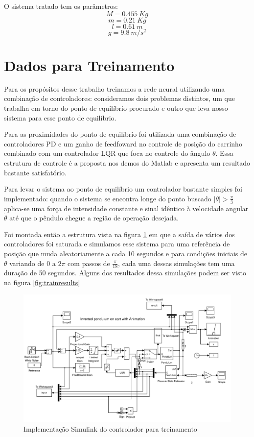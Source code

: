 \documentclass{article}
\begin{document}
O sistema tratado tem os parâmetros:
\begin{equation}
	M = 0.455\ Kg
\end{equation}
\begin{equation}
	m = 0.21\ Kg
\end{equation}
\begin{equation}
	l = 0.61\ m
\end{equation}
\begin{equation}
	g = 9.8\ m/s^2
\end{equation}
\section{Dados para Treinamento}
Para os propósitos desse trabalho treinamos a rede neural utilizando uma combinação de controladores: consideramos dois problemas distintos, um que trabalha em torno do ponto de equilíbrio procurado e outro que leva nosso sistema para esse ponto de equilíbrio. 

Para as proximidades do ponto de equilíbrio foi utilizada uma combinação de controladores PD e um ganho de feedfoward no controle de posição do carrinho combinado com um controlador LQR que foca no controle do ângulo $\theta$. Essa estrutura de controle é a proposta nos demos do Matlab e apresenta um resultado bastante satisfatório.

Para levar o sistema ao ponto de equilíbrio um controlador bastante simples foi implementado: quando o sistema se encontra longe do ponto buscado $|\theta| > \frac{\pi}{3}$ aplica-se uma força de intensidade constante e sinal idêntico à velocidade angular $\dot{\theta}$ até que o pêndulo chegue a região de operação desejada.

Foi montada então a estrutura vista na figura \ref{fig:train} em que a saída de vários dos controladores foi saturada e simulamos esse sistema para uma referência de posição que muda aleatoriamente a cada 10 segundos e para condições iniciais de $\theta$ variando de $0$ a $2\pi$ com passos de $\frac{\pi}{18}$, cada uma dessas simulações tem uma duração de 50 segundos. Alguns dos resultados dessa simulações podem ser visto na figura \ref{fig:trainresults}

\begin{figure}[H]
	\centering
	\includegraphics[width=\linewidth]{train}
	\caption{Implementação Simulink do controlador para treinamento}
	\label{fig:train}
\end{figure}
\end{document}

